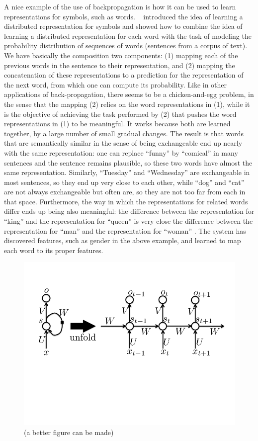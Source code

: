 \documentclass[11pt]{article} %
\begin{document}
A nice example of the use of backpropagation is how it can be used to learn
representations for symbols, such as words. ~\citet{Hinton86b} introduced the idea
of learning a distributed representation for symbols and \citet{BenDucVin01-short}
showed how to combine the idea of learning a distributed
representation for each word with the task of modeling the probability
distribution of sequences of words (sentences from a corpus of text). We
have basically the composition two components: (1) mapping each of the
previous words in the sentence to their representation, and (2) mapping the
concatenation of these representations to a prediction for the
representation of the next word, from which one can compute its
probability.  Like in other applications of back-propagation, there seems
to be a chicken-and-egg problem, in the sense that the mapping (2) relies
on the word representations in (1), while it is the objective of achieving
the task performed by (2) that pushes the word representations in (1) to be
meaningful. It works because both are learned together, by a large number
of small gradual changes. The result is that words that are semantically
similar in the sense of being exchangeable end up nearly with the same
representation: one can replace ``funny'' by ``comical'' in many sentences and
the sentence remains plausible, so these two words have almost the same
representation. Similarly, ``Tuesday'' and ``Wednesday'' are exchangeable in
most sentences, so they end up very close to each other, while ``dog'' and
``cat'' are not always exchangeable but often are, so they are not too far
from each in that space. Furthermore, the way in which the representations
for related words differ ends up being also meaningful: the difference
between the representation for ``king'' and the representation for ``queen'' is
very close the difference between the representation for ``man'' and the
representation for ``woman'' \citep{Mikolov-et-al-ICLR2013}. The system has discovered
features, such as gender in the above example, and learned to map each word
to its proper features.


\begin{figure}[H]
\centerline{\includegraphics[width=0.7\linewidth]{fig-hidden-recurrence-rnn.png}}
\caption{(a better figure can be made)}
\end{figure}
\end{document}

